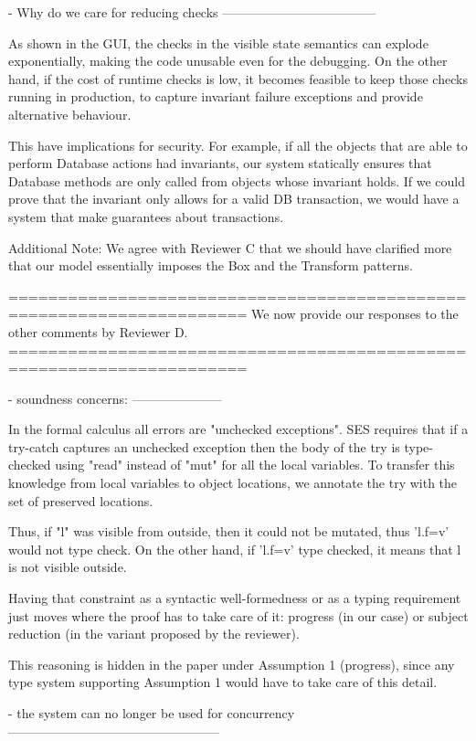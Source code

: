 - Why do we care for reducing checks
------------------------------------

As shown in the GUI, the checks in the visible state semantics can explode
exponentially, making the code unusable even for the debugging.
On the other hand, if the cost of runtime checks is low,
it becomes feasible to keep those checks running in production,
to capture invariant failure exceptions and provide alternative behaviour.

This have implications for security.
For example, if all the objects that are able to perform Database actions had invariants,
our system statically ensures that Database methods are only called from objects whose invariant holds.
If we could prove that the invariant only allows for a valid DB transaction, we would have a system
that make guarantees about transactions.

Additional Note: We agree with Reviewer C that we should have clarified more that our model essentially imposes the Box and the Transform patterns.


======================================================================
We now provide our responses to the other comments by Reviewer D.
======================================================================

- soundness concerns:
---------------------

In the formal calculus all errors are "unchecked exceptions".
SES requires that if a try-catch captures an unchecked exception then the body of the try
is type-checked using "read" instead of "mut" for all the local variables.
To transfer this knowledge from local variables to object locations, we annotate the try with
the set of preserved locations.

Thus, if "l" was visible from outside, then it could not be mutated, thus 'l.f=v' would not type check.
On the other hand, if 'l.f=v' type checked, it means that l is not visible outside.

Having that constraint as a syntactic well-formedness or as a typing requirement just moves 
where the proof has to take care of it: progress (in our case) or subject reduction
(in the variant proposed by the reviewer).

This reasoning is hidden in the paper under Assumption 1 (progress), since any type system
supporting Assumption 1 would have to take care of this detail.

- the system can no longer be used for concurrency
--------------------------------------------------

